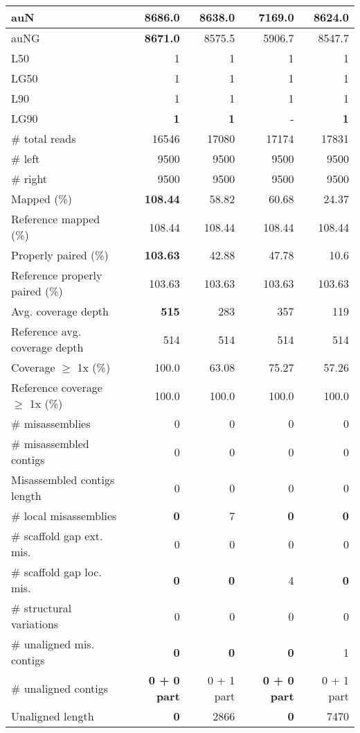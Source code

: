 \documentclass[12pt,a4paper]{article}
\begin{document}
\begin{table}[ht]
\begin{center}
\begin{tabular}{|l*{4}{|r}|}
auN & {\bf 8686.0} & 8638.0 & 7169.0 & 8624.0 \\ \hline
auNG & {\bf 8671.0} & 8575.5 & 5906.7 & 8547.7 \\ \hline
L50 & 1 & 1 & 1 & 1 \\ \hline
LG50 & 1 & 1 & 1 & 1 \\ \hline
L90 & 1 & 1 & 1 & 1 \\ \hline
LG90 & {\bf 1} & {\bf 1} & - & {\bf 1} \\ \hline
\# total reads & 16546 & 17080 & 17174 & 17831 \\ \hline
\# left & 9500 & 9500 & 9500 & 9500 \\ \hline
\# right & 9500 & 9500 & 9500 & 9500 \\ \hline
Mapped (\%) & {\bf 108.44} & 58.82 & 60.68 & 24.37 \\ \hline
Reference mapped (\%) & 108.44 & 108.44 & 108.44 & 108.44 \\ \hline
Properly paired (\%) & {\bf 103.63} & 42.88 & 47.78 & 10.6 \\ \hline
Reference properly paired (\%) & 103.63 & 103.63 & 103.63 & 103.63 \\ \hline
Avg. coverage depth & {\bf 515} & 283 & 357 & 119 \\ \hline
Reference avg. coverage depth & 514 & 514 & 514 & 514 \\ \hline
Coverage $\geq$ 1x (\%) & 100.0 & 63.08 & 75.27 & 57.26 \\ \hline
Reference coverage $\geq$ 1x (\%) & 100.0 & 100.0 & 100.0 & 100.0 \\ \hline
\# misassemblies & 0 & 0 & 0 & 0 \\ \hline
\# misassembled contigs & 0 & 0 & 0 & 0 \\ \hline
Misassembled contigs length & 0 & 0 & 0 & 0 \\ \hline
\# local misassemblies & {\bf 0} & 7 & {\bf 0} & {\bf 0} \\ \hline
\# scaffold gap ext. mis. & 0 & 0 & 0 & 0 \\ \hline
\# scaffold gap loc. mis. & {\bf 0} & {\bf 0} & 4 & {\bf 0} \\ \hline
\# structural variations & 0 & 0 & 0 & 0 \\ \hline
\# unaligned mis. contigs & {\bf 0} & {\bf 0} & {\bf 0} & 1 \\ \hline
\# unaligned contigs & {\bf 0 + 0 part} & 0 + 1 part & {\bf 0 + 0 part} & 0 + 1 part \\ \hline
Unaligned length & {\bf 0} & 2866 & {\bf 0} & 7470 \\ \hline

\end{tabular}
\end{center}
\end{table}
\end{document}
